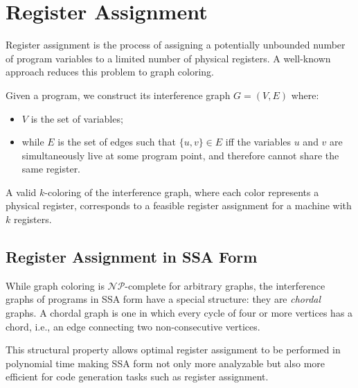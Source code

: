 \section{Register Assignment}
\label{sec:ra}

Register assignment is the process of assigning a potentially unbounded number of program variables to a limited number of physical registers. A well-known approach reduces this problem to graph coloring.

Given a program, we construct its interference graph $G = (V, E)$ where:

\begin{itemize}
    \item $V$ is the set of variables;
    \item while $E$ is the set of edges such that $\{ u, v \} \in E$ iff the variables $u$ and $v$ are simultaneously live at some program point, and therefore cannot share the same register.
\end{itemize}

A valid $k$-coloring of the interference graph, where each color represents a physical register, corresponds to a feasible register assignment for a machine with $k$ registers.

\subsection{Register Assignment in SSA Form}
\label{subsec:ssara}

While graph coloring is $\mathcal{NP}$-complete for arbitrary graphs, the interference graphs of programs in SSA form have a special structure: they are \textit{chordal} graphs. A chordal graph is one in which every cycle of four or more vertices has a chord, i.e., an edge connecting two non-consecutive vertices.

This structural property allows optimal register assignment to be performed in polynomial time making SSA form not only more analyzable but also more efficient for code generation tasks such as register assignment.
